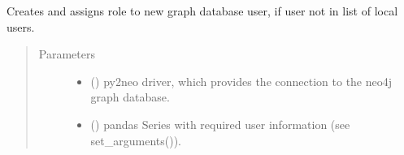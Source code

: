 \documentclass[letterpaper,10pt,english]{sphinxmanual}
\begin{document}

\begin{fulllineitems}
\label{\detokenize{_autosummary/graphdb_builder.users:graphdb_builder.users.users_controller.create_db_user}}
Creates and assigns role to new graph database user, if user not in list of local users.
\begin{quote}\begin{description}
\item[{Parameters}] \leavevmode\begin{itemize}
\item {} 
 () \textendash{} py2neo driver, which provides the connection to the neo4j graph database.

\item {} 
 () \textendash{} pandas Series with required user information (see set\_arguments()).

\end{itemize}

\end{description}\end{quote}

\end{fulllineitems}

\end{document}
